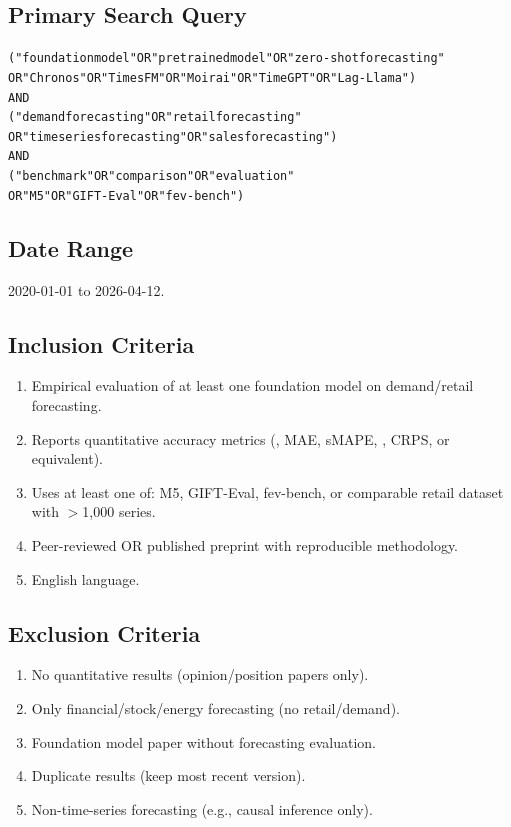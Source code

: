 \subsection{Primary Search Query}

\begin{alltt}
("foundation model" OR "pretrained model" OR "zero-shot forecasting"
 OR "Chronos" OR "TimesFM" OR "Moirai" OR "TimeGPT" OR "Lag-Llama")
AND
("demand forecasting" OR "retail forecasting"
 OR "time series forecasting" OR "sales forecasting")
AND
("benchmark" OR "comparison" OR "evaluation"
 OR "M5" OR "GIFT-Eval" OR "fev-bench")
\end{alltt}

\subsection{Date Range}

2020-01-01 to 2026-04-12.

\subsection{Inclusion Criteria}

\begin{enumerate}[nosep]
  \item Empirical evaluation of at least one foundation model on
    demand/retail forecasting.
  \item Reports quantitative accuracy metrics (\MASE{}, MAE, sMAPE,
    \WAPE{}, CRPS, or equivalent).
  \item Uses at least one of: M5, GIFT-Eval, fev-bench, or comparable
    retail dataset with $>$1{,}000 series.
  \item Peer-reviewed OR published preprint with reproducible methodology.
  \item English language.
\end{enumerate}

\subsection{Exclusion Criteria}

\begin{enumerate}[nosep]
  \item No quantitative results (opinion/position papers only).
  \item Only financial/stock/energy forecasting (no retail/demand).
  \item Foundation model paper without forecasting evaluation.
  \item Duplicate results (keep most recent version).
  \item Non-time-series forecasting (e.g., causal inference only).
\end{enumerate}


